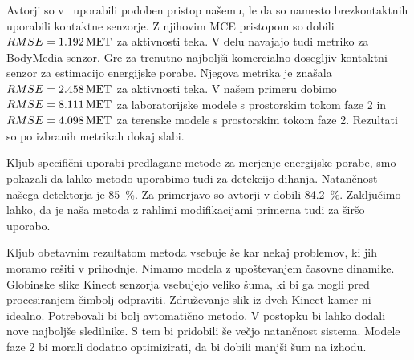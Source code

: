 Avtorji so v~\cite{gjoreski2015context} uporabili podoben pristop našemu, le da so namesto brezkontaktnih uporabili kontaktne senzorje. Z njihovim MCE pristopom so dobili ${RMSE}=\SI{1.192}{MET}$ za aktivnosti teka. V delu navajajo tudi metriko za BodyMedia senzor. Gre za trenutno najboljši komercialno dosegljiv kontaktni senzor za estimacijo energijske porabe. Njegova metrika je znašala ${RMSE}=\SI{2.458}{MET}$ za aktivnosti teka. V našem primeru dobimo ${RMSE}=\SI{8.111}{MET}$ za laboratorijske modele s prostorskim tokom faze 2 in ${RMSE}=\SI{4.098}{MET}$ za terenske modele s prostorskim tokom faze 2. Rezultati so po izbranih metrikah dokaj slabi. 

Kljub specifični uporabi predlagane metode za merjenje energijske porabe, smo pokazali da lahko metodo uporabimo tudi za detekcijo dihanja. Natančnost našega detektorja je \SI{85}{\%}. Za primerjavo so avtorji v \cite{nakajima2001development} dobili \SI{84.2}{\%}. Zaključimo lahko, da je naša metoda z rahlimi modifikacijami primerna tudi za širšo uporabo.

Kljub obetavnim rezultatom metoda vsebuje še kar nekaj problemov, ki jih moramo rešiti v prihodnje. Nimamo modela z upoštevanjem časovne dinamike. Globinske slike Kinect senzorja vsebujejo veliko šuma, ki bi ga mogli pred procesiranjem čimbolj odpraviti. Združevanje slik iz dveh Kinect kamer ni idealno. Potrebovali bi bolj avtomatično metodo. V postopku bi lahko dodali nove najboljše sledilnike. S tem bi pridobili še večjo natančnost sistema. Modele faze 2 bi morali dodatno optimizirati, da bi dobili manjši šum na izhodu.